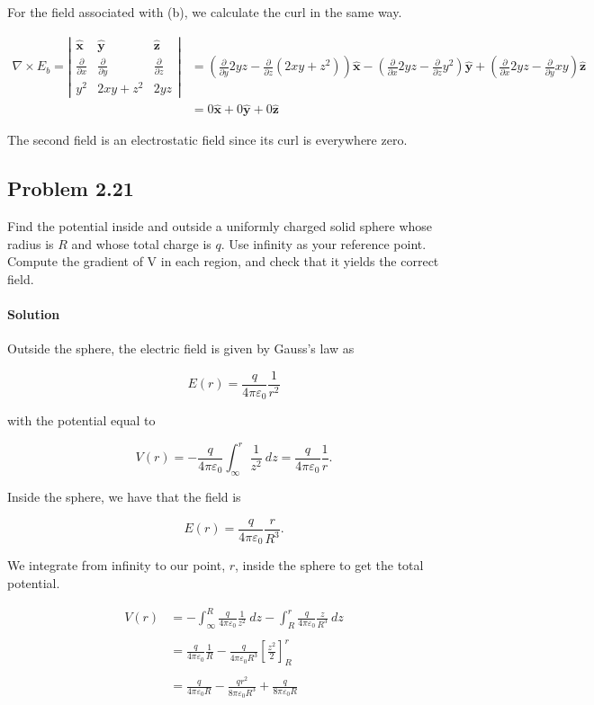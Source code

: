 \documentclass{article}
\newcommand{\bvec}[1]{\mathbf{\hat{#1}}}
\newcommand{\delx}{\frac{\partial}{\partial x}}
\newcommand{\dely}{\frac{\partial}{\partial y}}
\newcommand{\delz}{\frac{\partial}{\partial z}}
\begin{document}
For the field associated with (b), we calculate the curl in the same way.

\begin{align*}
    \nabla \times E_b = \left | \begin{array}{ccc}
         \bvec{x}& \bvec{y} & \bvec{z}  \\
         \frac{\partial}{\partial x} & \frac{\partial}{\partial y} & \frac{\partial}{\partial z}\\ 
         y^2 & 2xy + z^2 & 2yz
    \end{array} \right | &= \left ( \dely 2yz - \delz (2xy + z^2) \right )\bvec{x} - \left( \delx 2yz - \delz y^2 \right)\bvec{y} + \left(\delx 2yz - \dely xy \right)\bvec{z}\\
    &= 0\bvec{x} + 0\bvec{y} + 0\bvec{z}
\end{align*}

The second field is an electrostatic field since its curl is everywhere zero.

\newpage
\subsection*{Problem 2.21}
Find the potential inside and outside a uniformly charged solid sphere whose radius is $R$ and whose total charge is $q$. Use infinity as your reference point. Compute the gradient of V in each region, and check that it yields the correct field.

\paragraph{Solution} Outside the sphere, the electric field is given by Gauss's law as 

$$
E(r) = \frac{q}{4\pi\varepsilon_0}\frac{1}{r^2}
$$

with the potential equal to 

$$
V(r) = -\frac{q}{4\pi\varepsilon_0}\int_{\infty}^{r} \frac{1}{z^2} \ dz = \frac{q}{4\pi\varepsilon_0}\frac{1}{r}.
$$

Inside the sphere, we have that the field is 

$$
E(r) = \frac{q}{4\pi\varepsilon_0}\frac{r}{R^3}.
$$

We integrate from infinity to our point, $r$, inside the sphere to get the total potential. 

\begin{align*}
    V(r) &= -\int_{\infty}^R \frac{q}{4\pi\varepsilon_0}\frac{1}{z^2}\ dz -\int_{R}^r \frac{q}{4\pi\varepsilon_0}\frac{z}{R^3} \ dz \\
    \\
    &= \frac{q}{4\pi \varepsilon_0}\frac{1}{R} - \frac{q}{4\pi\varepsilon_0R^3}\left[ \frac{z^2}{2} \right]^r_R \\
    \\
    &= \frac{q}{4\pi \varepsilon_0R} - \frac{qr^2}{8\pi\varepsilon_0R^3} + \frac{q}{8\pi\varepsilon_0R}
\end{align*} 
\end{document}
